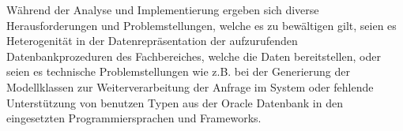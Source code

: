Während der Analyse und Implementierung ergeben sich diverse Herausforderungen und Problemstellungen, welche es zu bewältigen gilt, seien es Heterogenität in der Datenrepräsentation der aufzurufenden Datenbankprozeduren des Fachbereiches, welche die Daten bereitstellen, oder seien es technische Problemstellungen wie z.B. bei der Generierung der Modellklassen zur Weiterverarbeitung der Anfrage im System oder fehlende Unterstützung von benutzen Typen aus der Oracle Datenbank in den eingesetzten Programmiersprachen und Frameworks.  




